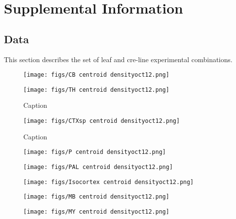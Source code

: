 
\section{Supplemental Information}

\subsection{Data}
\label{supp_sec:data}

This section describes the set of leaf and cre-line experimental combinations.

\newpage

\begin{figure}[H]
    \centering
    \texttt{[image: figs/CB centroid densityoct12.png]}
    \label{fig:my_label}
\end{figure}
\newpage

\begin{figure}[H]
    \centering
    \texttt{[image: figs/TH centroid densityoct12.png]}
    \caption{Caption}
    \label{fig:my_label}
\end{figure}
\newpage

\begin{figure}[H]
    \centering
    \texttt{[image: figs/CTXsp centroid densityoct12.png]}
    \caption{Caption}
    \label{fig:my_label}
\end{figure}
\newpage

\begin{figure}[H]
    \centering
    \texttt{[image: figs/P centroid densityoct12.png]}
    \label{fig:my_label}
\end{figure}
\newpage

\begin{figure}[H]
    \centering
    \texttt{[image: figs/PAL centroid densityoct12.png]} 
    \label{fig:my_label}
\end{figure}
\newpage

\begin{figure}[H]
    \centering
    \texttt{[image: figs/Isocortex centroid densityoct12.png]}
    \label{fig:my_label}
\end{figure}
\newpage

\begin{figure}[H]
    \centering
    \texttt{[image: figs/MB centroid densityoct12.png]} 
    \label{fig:my_label}
\end{figure}
\newpage

\begin{figure}[H]
    \centering
    \texttt{[image: figs/MY centroid densityoct12.png]} 
    \label{fig:my_label}
\end{figure}
\newpage

